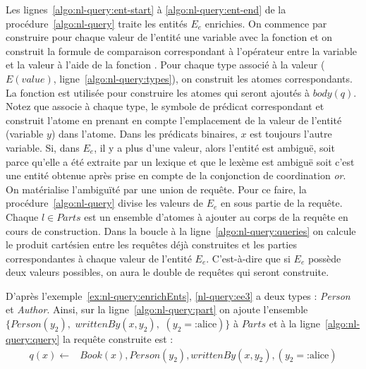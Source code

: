 Les lignes~\ref{algo:nl-query:ent-start} à \ref{algo:nl-query:ent-end} de la procédure~\ref{algo:nl-query} traite les entités $E_e$ enrichies.
On commence par construire pour chaque valeur de l'entité une variable avec la fonction \GetNewVar et on construit la formule de comparaison correspondant à l'opérateur entre la variable et la valeur à l'aide de la fonction \BuildAtomOP.
Pour chaque type associé à la valeur ($E(value)$, ligne~\ref{algo:nl-query:types}), on construit les atomes correspondants.
La fonction \BuildAtom est utilisée pour construire les atomes qui seront ajoutés à $body(q)$.
Notez que \BuildAtom associe à chaque type, le symbole de prédicat correspondant et construit l'atome en prenant en compte l'emplacement de la valeur de l'entité (variable $y$) dans l'atome.
Dans les prédicats binaires, $x$ est toujours l'autre variable.
Si, dans $E_e$, il y a plus d'une valeur, alors l'entité est ambiguë, soit parce qu'elle a été extraite par un lexique et que le lexème est ambiguë soit c'est une entité obtenue après prise en compte de la conjonction de coordination \textit{or}.
On matérialise l'ambiguïté par une union de requête.
Pour ce faire, la procédure~\ref{algo:nl-query} divise les valeurs de $E_e$ en sous partie de la requête.
Chaque $l \in Parts$ est un ensemble d'atomes à ajouter au corps de la requête en cours de construction.
Dans la boucle à la ligne~\ref{algo:nl-query:queries} on calcule le produit cartésien entre les requêtes déjà construites et les parties correspondantes à chaque valeur de l'entité $E_e$.
C'est-à-dire que si $E_e$ possède deux valeurs possibles, on aura le double de requêtes qui seront construite.

D'après l'exemple~\ref{ex:nl-query:enrichEnts}, \ref{nl-query:ee3} a deux types : \emph{Person} et \emph{Author}.
Ainsi, sur la ligne~\ref{algo:nl-query:part} on ajoute l'ensemble $\{ Person(y_2),$ $writtenBy(x, y_2),$ $(y_2= \text{:alice}) \}$ à $Parts$ et à la ligne~\ref{algo:nl-query:query} la requête construite est :
\begin{equation*}
    \begin{split}
        q(x) \leftarrow & Book(x), Person(y_2), writtenBy(x, y_2), (y_2= \text{:alice})
    \end{split}
\end{equation*}

